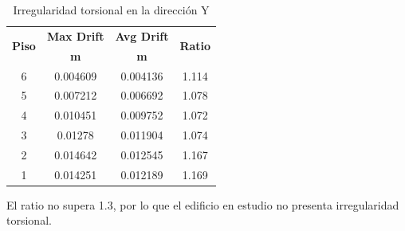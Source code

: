 \documentclass[12pt]{article}
\begin{document}
\begin{table}[h!]
  \centering
  \caption{Irregularidad torsional en la dirección Y}
    \begin{tabular}{|c|c|c|c|}
    \hline
    \multicolumn{1}{|c|}{\multirow{2}[4]{*}{\textbf{Piso}}} & \multicolumn{1}{p{5.39em}|}{\textbf{Max Drift}} & \multicolumn{1}{p{5.39em}|}{\textbf{Avg Drift}} & \multicolumn{1}{c|}{\multirow{2}[4]{*}{\textbf{Ratio}}} \\
\cline{2-3}          & \multicolumn{1}{c|}{\textbf{m}} & \multicolumn{1}{c|}{\textbf{m}} &  \\
    \hline
    6     & 0.004609 & 0.004136 & 1.114 \\
    \hline
    5     & 0.007212 & 0.006692 & 1.078 \\
    \hline
    4     & 0.010451 & 0.009752 & 1.072 \\
    \hline
    3     & 0.01278 & 0.011904 & 1.074 \\
    \hline
    2     & 0.014642 & 0.012545 & 1.167 \\
    \hline
    1     & 0.014251 & 0.012189 & 1.169 \\
    \hline
    \end{tabular}%
  \label{tab:addlabel}%
\end{table}%

El ratio no supera 1.3, por lo que el edificio en estudio no presenta irregularidad torsional.
\end{document}
